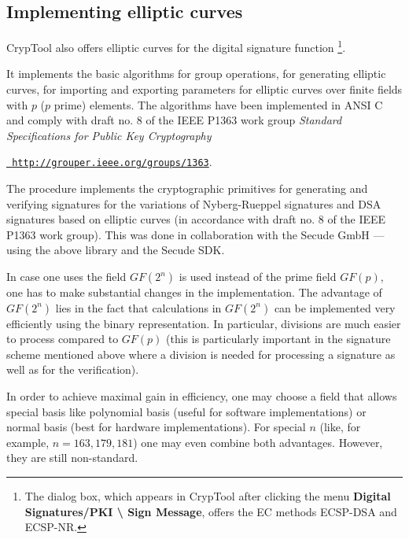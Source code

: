 \subsection{Implementing elliptic curves}

CrypTool also offers elliptic curves for the digital signature function%
\footnote{%
The dialog box, which appears in CrypTool after clicking the menu
{\bf Digital Signatures/PKI \textbackslash{} Sign Message},
offers the EC methods ECSP-DSA and ECSP-NR.
}.

It implements the basic algorithms for group operations, for generating elliptic
curves, for importing and exporting parameters for elliptic curves over finite
fields with $p$ ($p$ prime) elements. The algorithms have been implemented in
ANSI C and comply with draft no. 8 of the IEEE P1363 work group {\em Standard
Specifications for Public Key Cryptography}

{\href{http://grouper.ieee.org/groups/1363}{\tt
http://grouper.ieee.org/groups/1363}}.

The procedure implements the cryptographic primitives for generating and
verifying signatures for the variations of Nyberg-Rueppel signatures and
 DSA signatures based on elliptic curves (in accordance with draft
no. 8 of the IEEE P1363 work group). This was done in collaboration with the
Secude GmbH --- using the above library and the Secude SDK.

In case one uses the field $GF(2^n)$ is used instead of the prime field $GF(p)$, one has to make substantial changes in the implementation. The advantage of $GF(2^n)$ lies in the fact that calculations in $GF(2^n)$ can be implemented very efficiently using the binary representation. In particular, divisions are much easier to process compared to $GF(p)$ (this is particularly important in the signature scheme mentioned above where a division is needed for processing a signature as well as for the verification).

In order to achieve maximal gain in efficiency, one may choose a field that allows special basis like polynomial basis (useful for software implementations) or normal basis (best for hardware implementations). For special $n$ (like, for example, $n=163,179,181$) one may even combine both advantages. However, they are still non-standard.

